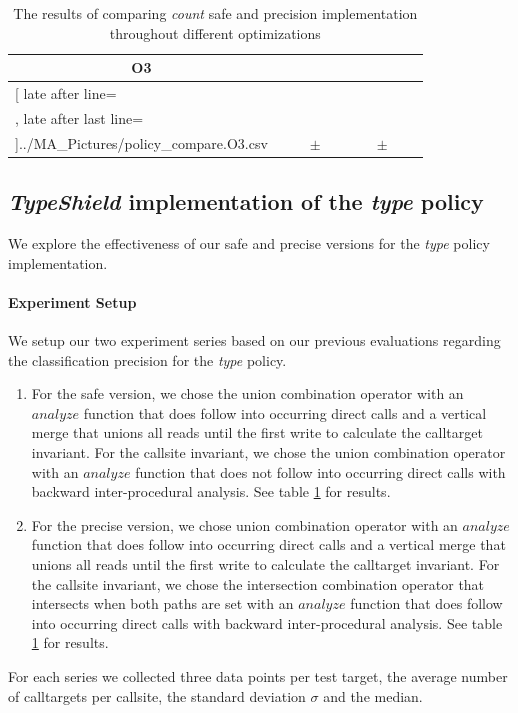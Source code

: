 \begin{table}[!htbp]
{\begin{tabular}{l|c|rcl|c|rcl|c}
\multicolumn{1}{c}{\bfseries O3}
	\\\midrule
	\csvreader[ late after line=\\, late after last line=\\\bottomrule]{../MA_Pictures/policy_compare.O3.csv}{
}
	{\csvcolii  &  \csvcoliii & \csvcoliv & $\pm$ & \csvcolv & \csvcolvi & \csvcolvii & $\pm$ & \csvcolviii& \csvcolix}%

    	\end{tabular}
}
		\caption {The results of comparing \textit{count} safe and precision implementation throughout different optimizations}
		\label{tbl:policycompcount}
\end{table}

\newpage

\subsection{\textit{TypeShield} implementation of the \textit{type} policy}
\label{subsection:typeshieldvslimitcount}
We explore the effectiveness of our safe and precise versions for the \textit{type} policy implementation.

\paragraph{Experiment Setup} We setup our two experiment series based on our previous evaluations regarding the classification precision for the \textit{type} policy.
\begin{enumerate}
\item For the safe version, we chose the union combination operator with an $analyze$ function that does follow into occurring direct calls  and a vertical merge that unions all reads until the first write to calculate the calltarget invariant. For the callsite invariant, we chose the union combination operator with an $analyze$ function that does not follow into occurring direct calls  with backward inter-procedural analysis.  See table \ref{tbl:policycompcount} for results. 
\item For the precise version, we chose union combination operator with an $analyze$ function that does follow into occurring direct calls  and a vertical merge that unions all reads until the first write to calculate the calltarget invariant. For the callsite invariant, we chose the intersection combination operator that intersects when both paths are set with an $analyze$ function that does follow into occurring direct calls with backward inter-procedural analysis. See table \ref{tbl:policycompcount} for results. 
\end{enumerate}
For each series we collected three data points per test target, the average number of calltargets per callsite, the standard deviation $\sigma$ and the median.

